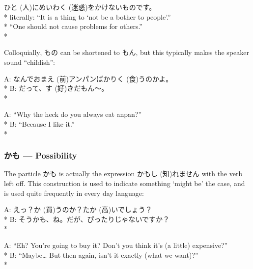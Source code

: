 \documentclass[11pt, b5paper, twoside, openright, onecolumn]{book}
\makeatletter
\newcommand*{\rubystack}[2]{{\relscale{0.5}%
  \begin{tabular}[b]{@{}c@{}}%
    {#1}\\%
   {\textscale{2}{#2}}%
  \end{tabular}}%
}
\DeclareRobustCommand*{\ruby}[2]{%
  \mbox{%
    \setlength{\parskip}{0ex}%
    \BeginAccSupp{method=pdfstringdef,ActualText={#1}}%
      \rubystack{\phantom{#2}}{#1}%
      \llap{%
        \rubystack{#2}{\phantom{#1}}%
      }%
    \EndAccSupp{}%
  }%
}
\renewcommand*{\ruby}[2]{#2 (#1)}%
\newenvironment{exampleblock}{
\setlength{\parindent}{0.6in}
\begin{minipage}[t]{\dimexpr\textwidth-\parindent}}
{\end{minipage}}
\makeatother
\begin{document}
\vspace{0.4cm}
\begin{exampleblock}
\ruby{人}{ひと}に\ruby{迷惑}{めいわく}をかけないものです。 \\* 
literally: “It is a thing to ‘not be a bother to people’.” \\* 
“One should not cause problems for others.” \\* 
\end{exampleblock}
\vspace{0.2cm}

Colloquially‚ もの can be shortened to もん‚ but this typically makes the speaker sound “childish”:

\vspace{0.4cm}
\begin{exampleblock}
A: なんでお\ruby{前}{まえ}アンパンばかり\ruby{食}{く}うのかよ。 \\* 
B: だって、\ruby{好}{す}きだもん～。 \\* 
\end{exampleblock}
\vspace{0.2cm}

\begin{exampleblock}
A: “Why the heck do you always eat anpan?” \\* 
B: “Because I like it.” \\* 
\end{exampleblock}
\subsubsection{かも — Possibility}


The particle かも is actually the expression かも\ruby{知}{し}れません with the verb left off. This construction is used to indicate something ‘might be’ the case‚ and is used quite frequently in every day language:

\vspace{0.4cm}
\begin{exampleblock}
A: えっ？\ruby{買}{か}うのか？\ruby{高}{たか}いでしょう？ \\* 
B: そうかも、ね。だが、ぴったりじゃないですか？ \\* 
\end{exampleblock}
\vspace{0.2cm}

\begin{exampleblock}
A: “Eh? You’re going to buy it? Don’t you think it’s (a little) expensive?” \\* 
B: “Maybe… But then again‚ isn’t it exactly (what we want)?” \\* 
\end{exampleblock}
\vspace{0.2cm}
\end{document}
